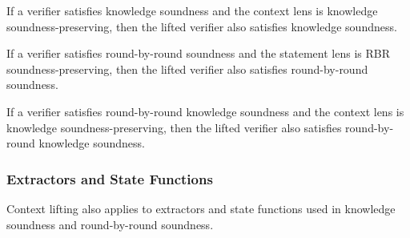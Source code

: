 \begin{theorem}
    \label{thm:lift_context_knowledge_soundness}
    If a verifier satisfies knowledge soundness and the context lens is knowledge soundness-preserving, then the lifted verifier also satisfies knowledge soundness.
\end{theorem}

\begin{theorem}
    \label{thm:lift_context_rbr_soundness}
    If a verifier satisfies round-by-round soundness and the statement lens is RBR soundness-preserving, then the lifted verifier also satisfies round-by-round soundness.
\end{theorem}

\begin{theorem}
    \label{thm:lift_context_rbr_knowledge_soundness}
    If a verifier satisfies round-by-round knowledge soundness and the context lens is knowledge soundness-preserving, then the lifted verifier also satisfies round-by-round knowledge soundness.
\end{theorem}

\subsubsection{Extractors and State Functions}

Context lifting also applies to extractors and state functions used in knowledge soundness and round-by-round soundness.

\begin{definition}
    \label{def:straightline_extractor_lift_context}
\end{definition}

\begin{definition}
    \label{def:rbr_extractor_lift_context}
\end{definition}

\begin{definition}
    \label{def:state_function_lift_context}
\end{definition}

